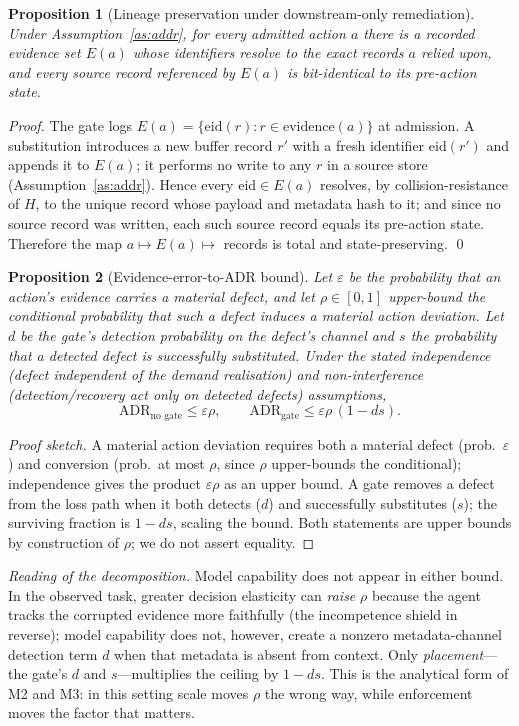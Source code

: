 \documentclass[11pt]{article}
\theoremstyle{plain}
\newtheorem{proposition}{Proposition}
\theoremstyle{definition}
\begin{document}
\begin{proposition}[Lineage preservation under downstream-only remediation]\label{prop:lineage}
Under Assumption~\ref{as:addr}, for every admitted action $a$ there is a recorded
evidence set $E(a)$ whose identifiers resolve to the exact records $a$ relied upon,
and every source record referenced by $E(a)$ is bit-identical to its pre-action
state.
\end{proposition}
\begin{proof}
The gate logs $E(a)=\{\mathrm{eid}(r):r\in \text{evidence}(a)\}$ at admission. A
substitution introduces a new buffer record $r'$ with a fresh identifier
$\mathrm{eid}(r')$ and appends it to $E(a)$; it performs no write to any $r$ in a
source store (Assumption~\ref{as:addr}). Hence every $\mathrm{eid}\in E(a)$
resolves, by collision-resistance of $H$, to the unique record whose payload and
metadata hash to it; and since no source record was written, each such source
record equals its pre-action state. Therefore the map $a\mapsto E(a)\mapsto$
records is total and state-preserving. \qed
\end{proof}

\begin{proposition}[Evidence-error-to-ADR bound]\label{prop:bound}
Let $\varepsilon$ be the probability that an action's evidence carries a material
defect, and let $\rho\in[0,1]$ \emph{upper-bound} the conditional probability that such a
defect induces a material action deviation. Let $d$ be the gate's detection probability on
the defect's channel and $s$ the probability that a detected defect is successfully
substituted. Under the stated independence (defect independent of the demand realisation)
and non-interference (detection/recovery act only on detected defects) assumptions,
\[
\mathrm{ADR}_{\text{no gate}} \le \varepsilon\rho, \qquad
\mathrm{ADR}_{\text{gate}} \le \varepsilon\rho\,(1-ds).
\]
\end{proposition}
\begin{proof}[Proof sketch]
A material action deviation requires both a material defect (prob.\ $\varepsilon$) and
conversion (prob.\ at most $\rho$, since $\rho$ upper-bounds the conditional); independence
gives the product $\varepsilon\rho$ as an upper bound. A gate removes a defect from the
loss path when it both detects ($d$) and successfully substitutes ($s$); the surviving
fraction is $1-ds$, scaling the bound. Both statements are upper bounds by construction of
$\rho$; we do not assert equality.
\end{proof}
\noindent\emph{Reading of the decomposition.} Model capability does not appear in
either bound. In the observed task, greater decision elasticity can \emph{raise} $\rho$
because the agent tracks the corrupted evidence more faithfully (the incompetence shield in
reverse); model capability does not, however, create a nonzero metadata-channel detection
term $d$ when that metadata is absent from context. Only \emph{placement}---the gate's $d$
and $s$---multiplies the ceiling by $1-ds$. This is the analytical form of M2 and M3:
in this setting scale moves $\rho$ the wrong way, while enforcement moves the factor that
matters.
\end{document}
